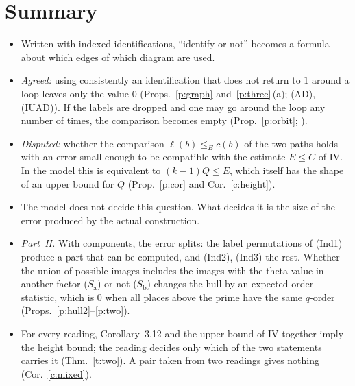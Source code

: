 \documentclass[11pt,a4paper]{article}
\newcommand{\Sa}{S_{\mathrm a}}
\newcommand{\Sb}{S_{\mathrm b}}
\theoremstyle{plain}
\theoremstyle{definition}
\theoremstyle{remark}
\begin{document}
\section{Summary}\label{s:sum}
\begin{itemize}
\item Written with indexed identifications, ``identify or not'' becomes a formula about which edges of which diagram are
used.
\item \emph{Agreed:} using consistently an identification that does not return to $1$ around a loop leaves only the value
$0$ (Props.~\ref{p:graph} and~\ref{p:three}\,(a); (AD), (IUAD)). If the labels are dropped and one may go around the loop
any number of times, the comparison becomes empty (Prop.~\ref{p:orbit}; \cite[Remark~3.11.1\,(vii)]{IUT3}).
\item \emph{Disputed:} whether the comparison $\ell(b)\le_E c(b)$ of the two paths holds with an error small enough to be
compatible with the estimate $E\le C$ of IV. In the model this is equivalent to $(k-1)Q\le E$, which itself has the shape
of an upper bound for $Q$ (Prop.~\ref{p:cor} and Cor.~\ref{c:height}).
\item The model does not decide this question. What decides it is the size of the error produced by the actual
construction.
\item \emph{Part~II.} With components, the error splits: the label permutations of (Ind1) produce a part that can be
computed, and (Ind2), (Ind3) the rest. Whether the union of possible images includes the images with the theta value in
another factor ($\Sa$) or not ($\Sb$) changes the hull by an expected order statistic, which is $0$ when all places
above the prime have the same $q$-order (Props.~\ref{p:hull2}--\ref{p:two}).
\item For every reading, Corollary~3.12 and the upper bound of IV together imply the height bound; the reading decides
only which of the two statements carries it (Thm.~\ref{t:two}). A pair taken from two readings gives nothing
(Cor.~\ref{c:mixed}).
\end{itemize}
\end{document}
